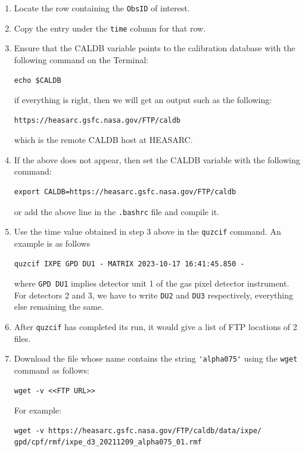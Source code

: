 \begin{itemize}
\begin{enumerate}
			\item Locate the row containing the \verb|ObsID| of interest.
			
			\item Copy the entry under the \verb|time| column for that row.
			
			\item Ensure that the CALDB variable points to the calibration database with the following command on the Terminal:
			\begin{verbatim}
echo $CALDB
			\end{verbatim}			
			if everything is right, then we will get an output such as the following:
			\begin{verbatim}
https://heasarc.gsfc.nasa.gov/FTP/caldb
			\end{verbatim}
			which is the remote CALDB host at HEASARC.
			
			\item If the above does not appear, then set the CALDB variable with the following command:
			\begin{verbatim}
export CALDB=https://heasarc.gsfc.nasa.gov/FTP/caldb
			\end{verbatim}
			or add the above line in the \verb|.bashrc| file and compile it.
			
			\item Use the time value obtained in step 3 above in the \verb|quzcif| command. An example is as follows
			\begin{verbatim}
quzcif IXPE GPD DU1 - MATRIX 2023-10-17 16:41:45.850 -
			\end{verbatim}
			where \verb|GPD DU1| implies detector unit 1 of the gas pixel detector instrument. For detectors 2 and 3, we have to write \verb|DU2| and \verb|DU3| respectively, everything else remaining the same.
			
			\item After \verb|quzcif| has completed its run, it would give a list of FTP locations of 2 files.
			
			\item Download the file whose name contains the string \verb|'alpha075'| using the \verb|wget| command as follows:
			\begin{verbatim}
wget -v <<FTP URL>>
			\end{verbatim}
			For example:
			\begin{verbatim}
wget -v https://heasarc.gsfc.nasa.gov/FTP/caldb/data/ixpe/
gpd/cpf/rmf/ixpe_d3_20211209_alpha075_01.rmf
			\end{verbatim}
			

\end{enumerate}
\end{itemize}

